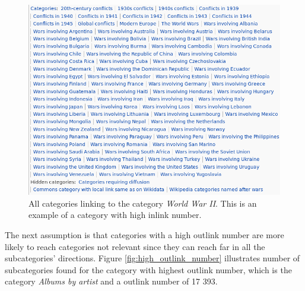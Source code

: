 \begin{figure}[h]
\centering
\includegraphics[width=\textwidth]{Chapters/Implementation/Grading/high_inlink_number}
\caption[Example of category with high \emph{inlink number}]{All categories linking to the category \emph{World War II}. This is an example of a category with high inlink number.}
\label{fig:high_inlink_number}
\end{figure}

The next assumption is that categories with a high outlink number are more likely to reach categories not relevant since they can reach far in all the subcategories' directions. Figure \ref{fig:high_outlink_number} illustrates number of subcategories found for the category with highest outlink number, which is the category \emph{Albums by artist} and a outlink number of 17 393. 


